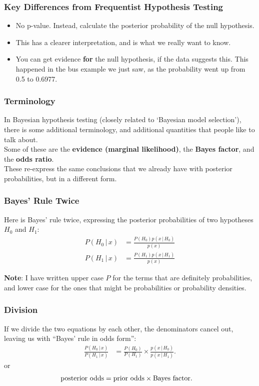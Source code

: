 \documentclass{beamer}
\newcommand{\given}{\,|\,}
\begin{document}
\begin{frame}[fragile]
\frametitle{Key Differences from Frequentist Hypothesis Testing}

\begin{itemize}
\item No p-value. Instead, calculate the posterior probability of the null
hypothesis.\pause
\item This has a clearer interpretation, and is what we really want to know.\pause
\item You can get evidence {\bf for} the null hypothesis, if the data
suggests this. This happened in the bus example we just saw, as the
probability went up from 0.5 to 0.6977.
\end{itemize}

\end{frame}


\begin{frame}[fragile]
\frametitle{Terminology}
In Bayesian hypothesis testing (closely related to `Bayesian model selection'),
there is some additional terminology, and additional quantities that people
like to talk about.\\[0.5em]

Some of these are the {\bf evidence (marginal likelihood)},
the {\bf Bayes factor}, and the {\bf odds ratio}.\\[0.5em]

These re-express the same conclusions that we already have with posterior
probabilities, but in a different form.

\end{frame}


\begin{frame}
\frametitle{Bayes' Rule Twice}
Here is Bayes' rule twice, expressing the posterior probabilities of two
hypotheses $H_0$ and $H_1$:
\begin{align}
P(H_0 \given x) &= \frac{P(H_0)p(x \given H_0)}{p(x)} \\
P(H_1 \given x) &= \frac{P(H_1)p(x \given H_1)}{p(x)}
\end{align}
\pause

{\bf Note}: I have written upper case $P$ for the terms that are
definitely probabilities, and lower case for the ones that might
be probabilities or probability densities.


\end{frame}


\begin{frame}
\frametitle{Division}
If we divide the two equations by each other, the denominators cancel out,
leaving us with ``Bayes' rule in odds form'':
\begin{align}
\frac{P(H_0 \given x)}{P(H_1 \given x)}
    &= \frac{P(H_0)}{P(H_1)} \times \frac{p(x \given H_0)}{p(x \given H_1)}.
\end{align}
\pause
or
\begin{align}
\textnormal{posterior odds} &=
    \textnormal{prior odds} \times \textnormal{Bayes factor}.
\end{align}


\end{frame}
\end{document}
